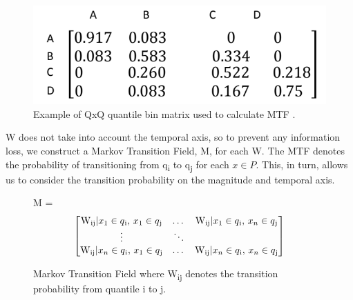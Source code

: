 \documentclass{turabian-thesis}
\begin{document}
\begin{figure}[h!]
   \begin{center}
      \includegraphics[scale=0.6]{../media/mtf_q.png}
   \end{center}
   \caption{Example of QxQ quantile bin matrix used to calculate MTF \cite{wang_encoding_nodate}.}
   \label{fig:mtf_q}
\end{figure}
 





W does not take into account the temporal axis, so to prevent any information loss, we construct a Markov Transition Field, M, for each W. The MTF denotes the probability of transitioning from q\textsubscript{i} to q\textsubscript{j} for each $x \in P$. This, in turn, allows us to consider the transition probability on the magnitude and temporal axis.

\begin{figure}[h!]
  \centering
  M =
  \[\begin{bmatrix}

  \text{W\textsubscript{ij}} | \text{$x\textsubscript{1} \in q\textsubscript{i}$, $x_{1} \in q\textsubscript{j}$}
  & \dots &
  
  \text{W\textsubscript{ij}}  |  \text{$x_{1} \in q\textsubscript{i}$, $x_{n} \in q\textsubscript{j}$} 
  
  \\
  
  \vdots &  \ddots & \\
  
  \text{W\textsubscript{ij}} | \text{$x_{n} \in q\textsubscript{i}$, $x_{1} \in q\textsubscript{j}$}
  & \dots &
  \text{W\textsubscript{ij}} | \text{$x_{n} \in q\textsubscript{i}$, $x_{n} \in q\textsubscript{j}$} \\
  
  
  \end{bmatrix}\]
  \caption{Markov Transition Field where  W\textsubscript{ij} denotes the transition probability from quantile i to j.}
  \label{fig:mtf}
\end{figure}
\end{document}

